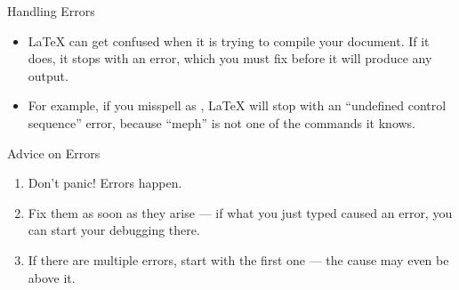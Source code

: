 \documentclass{beamer}
\begin{document}
\begin{frame}[fragile]{Handling Errors}
\begin{itemize}
\item \LaTeX{} can get confused when it is trying to compile your document. If
it does, it stops with an error, which you must fix before it will produce
any output.
\item For example, if you misspell  as , \LaTeX{} will
stop with an ``undefined control sequence'' error, because ``meph'' is not
one of the commands it knows.
\end{itemize}
\begin{block}{Advice on Errors}
\begin{enumerate}
\item Don't panic! Errors happen.
\item Fix them as soon as they arise --- if what you just typed caused an error,
you can start your debugging there.
\item If there are multiple errors, start with the first one --- the cause may
even be above it.
\end{enumerate}
\end{block}
\end{frame}

\end{document}

